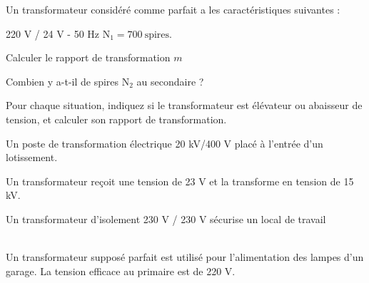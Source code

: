\documentclass[11pt,a4paper]{article}
\newcommand{\cadreblanc}[1]{%
\medskip\framebox[\linewidth][c]{%
\rule{0mm}{#1mm}}\par
\medskip}
\begin{document}
 Un transformateur considéré comme parfait a les caractéristiques suivantes : \\\begin{center}
220 V / 24 V - 50 Hz $\mathrm{N_1=700~spires}$.
\end{center}

\vfill 

 Calculer le rapport de transformation $m$ 

\cadreblanc{20}

\vfill 

 Combien y a-t-il de spires $\mathrm{N_2}$ au secondaire ? 

\cadreblanc{20}

\vfill 

\begin{center}
Pour chaque situation, indiquez si le transformateur est élévateur ou abaisseur de tension, et calculer son rapport de transformation. 
\end{center}

\vfill 

 Un poste de transformation électrique 20 kV/400 V placé à l'entrée d'un lotissement. 

\cadreblanc{20}

\vfill 

 Un transformateur  reçoit une tension de 23 V et la transforme en tension de 15 kV. 

\cadreblanc{20}

\vfill 

 Un transformateur d'isolement 230 V / 230 V sécurise un local de travail 

\cadreblanc{15}

\vfill 


\newpage 

 \\[8mm]

Un transformateur supposé parfait est utilisé pour l'alimentation des lampes d'un garage.  La tension efficace au primaire est de 220 V. 
\end{document}
